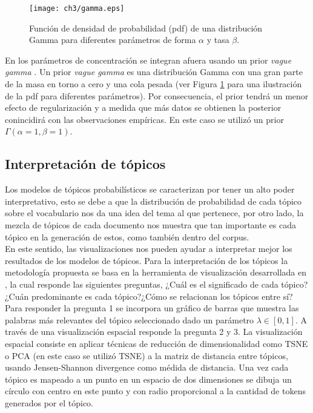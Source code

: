 \begin{figure}
    \texttt{[image: ch3/gamma.eps]}
    \caption{Función de densidad de probabilidad (pdf) de una distribución Gamma para diferentes parámetros de forma $\alpha$ y tasa $\beta$.}
    \label{img:gamma}
\end{figure}

En \citep{teh2005sharing} los parámetros de concentración se integran afuera usando un prior \textit{vague gamma} \citep{escobar1995bayesian}. Un prior \textit{vague gamma} es una distribución Gamma con una gran parte de la masa en torno a cero y una cola pesada (ver Figura \ref{img:gamma} para una ilustración de la pdf para diferentes parámetros). Por consecuencia, el prior tendrá un menor efecto de regularización y a medida que más datos se obtienen la posterior conincidirá con las observaciones empíricas. En este caso se utilizó un prior $\Gamma(\alpha=1, \beta=1)$.

\subsection{Interpretación de tópicos}

Los modelos de tópicos probabilísticos se caracterizan por tener un alto poder interpretativo, esto se debe a que la distribución de probabilidad de cada tópico sobre el vocabulario nos da una idea del tema al que pertenece, por otro lado, la mezcla de tópicos de cada documento nos muestra que tan importante es cada tópico en la generación de estos, como también dentro del corpus. \\

En este sentido, las visualizaciones nos pueden ayudar a interpretar mejor los resultados de los modelos de tópicos. Para la interpretación de los tópicos la metodología propuesta se basa en la herramienta de visualización desarrollada en  \citep{sievert2014ldavis}, la cual responde las siguientes preguntas, ¿Cuál es el significado de cada tópico?¿Cuán predominante es cada tópico?¿Cómo se relacionan los tópicos entre sí?\\

Para responder la pregunta 1 se incorpora un gráfico de barras que muestra las palabras más relevantes del tópico seleccionado dado un parámetro $\lambda \in [0,1]$. A través de una visualización espacial responde la pregunta 2 y 3. La visualización espacial consiste en aplicar técnicas de reducción de dimensionalidad como TSNE \citep{maaten2008visualizing} o PCA \citep{wold1987principal} (en este caso se utilizó TSNE) a la matriz de distancia entre tópicos, usando Jensen-Shannon divergence \citep{endres2003new} como médida de distancia. Una vez cada tópico es mapeado a un punto en un espacio de dos dimensiones se dibuja un círculo con centro en este punto y con radio proporcional a la cantidad de tokens generados por el tópico.\\

